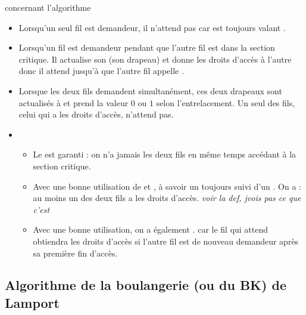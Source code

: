 \begin{adjustwidth}{-3cm}{-3cm}
\begin{remarque}{}{concernant l'algorithme}
    \begin{itemize}
        \item Lorsqu'un seul fil est demandeur, il n'attend pas car  est toujours valant .
        \item Lorsqu'un fil est demandeur pendant que l'autre fil est dans la section critique. Il actualise son  (son drapeau) et donne les droits d'accès à l'autre donc il attend jusqu'à que l'autre fil appelle .
        \item Lorsque les deux fils demandent simultanément, ces deux drapeaux sont actualisés à  et  prend la valeur $0$ ou $1$ selon l'entrelacement. Un seul des fils, celui qui a les droits d'accès, n'attend pas.
        \item \begin{itemize}
            \item Le  est garanti : on n'a jamais les deux fils en même temps accédant à la section critique.
            \item Avec une bonne utilisation de  et , à savoir un  toujours suivi d'un . On a  : au moins un des deux fils a les droits d'accès. \textit{voir la def, jvois pas ce que c'est}
            \item Avec une bonne utilisation, on a également . car le fil qui attend obtiendra les droits d'accès si l'autre fil est de nouveau demandeur après sa première fin d'accès.
        \end{itemize}
    \end{itemize}
\end{remarque}

\subsection{Algorithme de la boulangerie (ou du BK) de Lamport}


\end{adjustwidth}
